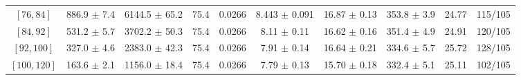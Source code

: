 \begin{tabular}{c||c|c|c|c|c|c|c||c|c}
$[76, 84]$ & 886.9 $\pm$ 7.4 & 6144.5 $\pm$ 65.2 & 75.4 & 0.0266 & 8.443 $\pm$ 0.091 & 16.87 $\pm$ 0.13 & 353.8 $\pm$ 3.9 & 24.77 & 115/105\\
$[84, 92]$ & 531.2 $\pm$ 5.7 & 3702.2 $\pm$ 50.3 & 75.4 & 0.0266 & 8.11 $\pm$ 0.11 & 16.62 $\pm$ 0.16 & 351.4 $\pm$ 4.9 & 24.91 & 120/105\\
$[92, 100]$ & 327.0 $\pm$ 4.6 & 2383.0 $\pm$ 42.3 & 75.4 & 0.0266 & 7.91 $\pm$ 0.14 & 16.64 $\pm$ 0.21 & 334.6 $\pm$ 5.7 & 25.72 & 128/105\\
$[100, 120]$ & 163.6 $\pm$ 2.1 & 1156.0 $\pm$ 18.4 & 75.4 & 0.0266 & 7.79 $\pm$ 0.13 & 15.70 $\pm$ 0.18 & 332.4 $\pm$ 5.1 & 25.11 & 102/105\\
\end{tabular}

